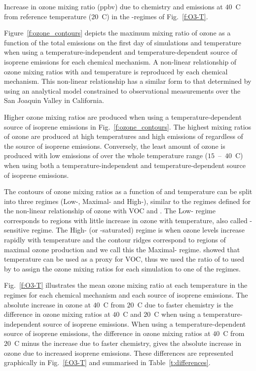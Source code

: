 \begin{table}%
    \centering%
    \caption{Increase in ozone mixing ratio (ppbv) due to chemistry and emissions at $40$~\degree C from reference temperature ($20$~\degree C) in the -regimes of Fig.~\ref{f:O3-T}.}%
    \label{t:differences}%
\end{table}

Figure~\ref{f:ozone_contours} depicts the maximum mixing ratio of ozone as a function of the total  emissions on the first day of simulations and temperature when using a temperature-independent and temperature-dependent source of isoprene emissions for each chemical mechanism.
A non-linear relationship of ozone mixing ratios with  and temperature is reproduced by each chemical mechanism.
This non-linear relationship has a similar form to that determined by \citet{Pusede:2014} using an analytical model constrained to observational measurements over the San Joaquin Valley in California.

Higher ozone mixing ratios are produced when using a temperature-dependent source of isoprene emissions in Fig.~\ref{f:ozone_contours}.
The highest mixing ratios of ozone are produced at high temperatures and high emissions of  regardless of the source of isoprene emissions.
Conversely, the least amount of ozone is produced with low emissions of  over the whole temperature range ($15$~--~$40$~\degree C) when using both a temperature-independent and temperature-dependent source of isoprene emissions.

The contours of ozone mixing ratios as a function of  and temperature can be split into three  regimes (Low-, Maximal- and High-), similar to the  regimes defined for the non-linear relationship of ozone with VOC and .
The Low- regime corresponds to regions with little increase in ozone with temperature, also called -sensitive regime.
The High- (or -saturated) regime is when ozone levels increase rapidly with temperature and the contour ridges correspond to regions of maximal ozone production and we call this the Maximal- regime.
\citet{Pusede:2014} showed that temperature can be used as a proxy for VOC, thus we used the ratio of  to  used by \citet{Sillman:1995} to assign the ozone mixing ratios for each simulation to one of the  regimes.

Fig.~\ref{f:O3-T} illustrates the mean ozone mixing ratio at each temperature in the  regimes for each chemical mechanism and each source of isoprene emissions.  
The absolute increase in ozone at $40$~\degree C from $20$~\degree C due to faster chemistry is the difference in ozone mixing ratios at $40$~\degree C and $20$~\degree C when using a temperature-independent source of isoprene emissions.
When using a temperature-dependent source of isoprene emissions, the difference in ozone mixing ratios at $40$~\degree C from $20$~\degree C minus the increase due to faster chemistry, gives the absolute increase in ozone due to increased isoprene emissions.
These differences are represented graphically in Fig.~\ref{f:O3-T} and summarised in Table~\ref{t:differences}.


